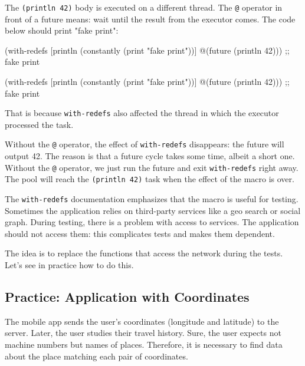 The \verb|(println 42)| body is executed on a different thread.
The \verb|@| operator in front of a future means: wait until the result from the executor comes.
The code below should print "fake print":


\ifx\DEVICETYPE\MOBILE

\begin{clojure}
(with-redefs
  [println (constantly
             (print "fake print"))]
  @(future (println 42)))
;; fake print
\end{clojure}

\else

\begin{clojure}
(with-redefs
  [println (constantly (print "fake print"))]
  @(future (println 42)))
;; fake print
\end{clojure}

\fi

That is because \verb|with-redefs| also affected the thread in which the executor processed the task.

\noindent
Without the \verb|@| operator, the effect of \verb|with-redefs| disappears: the future will output 42. The reason is that a future cycle takes some time, albeit a short one.
Without the \verb|@| operator, we just run the future and exit \verb|with-redefs| right away.
The pool will reach the \verb|(println 42)| task when the effect of the macro is over.

The \verb|with-redefs| documentation emphasizes that the macro is useful for testing.
Sometimes the application relies on third-party services like a geo search or social graph.
During testing, there is a problem with access to services.
The application should not access them: this complicates tests and makes them dependent.

The idea is to replace the functions that access the network during the tests.
Let's see in practice how to do this.

\subsection{Practice: Application with Coordinates}


The mobile app sends the user's coordinates (longitude and latitude) to the server.
Later, the user studies their travel history.
Sure, the user expects not machine numbers but names of places.
Therefore, it is necessary to find data about the place matching each pair of coordinates.

